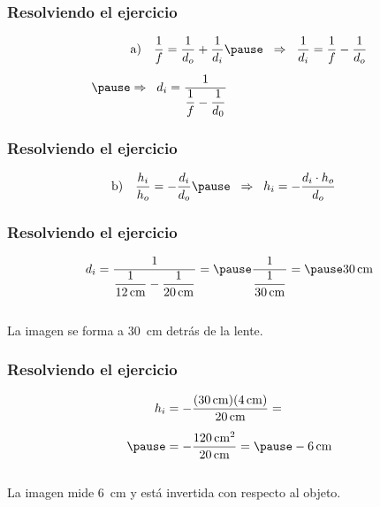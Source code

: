 \documentclass[14pt]{beamer}
\begin{document}
\begin{frame}
\frametitle{Resolviendo el ejercicio}
\pause
\begin{eqnarray*}
\begin{aligned}
&\text{a)} \quad \dfrac{1}{f} = \dfrac{1}{d_{o}} + \dfrac{1}{d_{i}} \pause \hspace{0.2cm} \Rightarrow \hspace*{0.2cm} \dfrac{1}{d_{i}} = \dfrac{1}{f} - \dfrac{1}{d_{o}} \\[0.5em] \pause
&\Rightarrow \hspace*{0.2cm} d_{i} = \dfrac{1}{\dfrac{1}{f} - \dfrac{1}{d_{0}}}
\end{aligned}
\end{eqnarray*}
\end{frame}
\begin{frame}
\frametitle{Resolviendo el ejercicio}
\pause
\begin{eqnarray*}
\begin{aligned}
&\text{b)} \quad \dfrac{h_{i}}{h_{o}} = - \dfrac{d_{i}}{d_{o}} \pause \hspace{0.2cm} \Rightarrow \hspace*{0.2cm} h_{i} = - \dfrac{d_{i} \cdot h_{o}}{d_{o}} 
\end{aligned}
\end{eqnarray*}
\end{frame}
\begin{frame}
\frametitle{Resolviendo el ejercicio}
\pause
\begin{eqnarray*}
\begin{aligned}
d_{i} = \dfrac{1}{\dfrac{1}{\SI{12}{\centi\meter}} - \dfrac{1}{\SI{20}{\centi\meter}}} = \pause \dfrac{1}{\dfrac{1}{\SI{30}{\centi\meter}}} = \pause \SI{30}{\centi\meter}
\end{aligned}
\end{eqnarray*}
\pause
\\[0.5em]
La imagen se forma a \SI{30}{\centi\meter} detrás de la lente.
\end{frame}
\begin{frame}
\frametitle{Resolviendo el ejercicio}
\pause
\begin{eqnarray*}
\begin{aligned}
h_{i} &= - \dfrac{(\SI{30}{\centi\meter})(\SI{4}{\centi\meter})}{\SI{20}{\centi\meter}} = \\[0.5em] \pause
&= - \dfrac{\SI{120}{\square\centi\meter}}{\SI{20}{\centi\meter}} = \pause - \SI{6}{\centi\meter}
\end{aligned}
\end{eqnarray*}
\pause
\\[0.2em]
La imagen mide \SI{6}{\centi\meter} y está invertida con respecto al objeto.
\end{frame}
\end{document}
